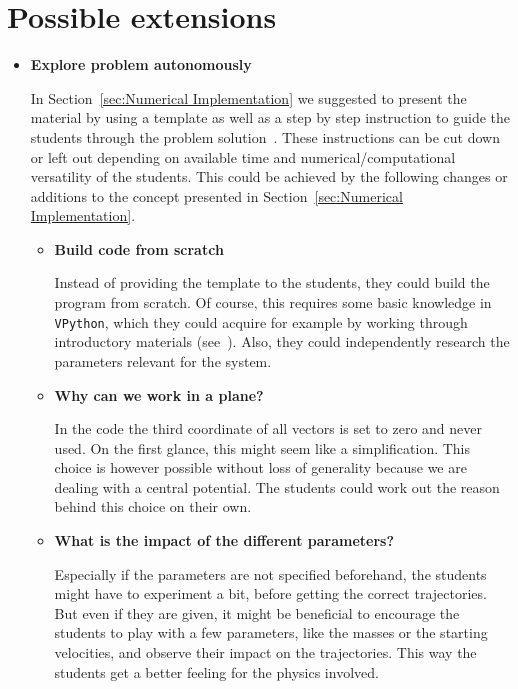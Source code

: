\documentclass[12pt,ngerman,american]{iopart}
\newcommand{\vpython}[0]{\texttt{VPython}}
\begin{document}
\section{Possible extensions}\label{sec:extensions}

\begin{itemize}

\item \textbf{Explore problem autonomously}

In Section~\ref{sec:Numerical Implementation} we suggested to present the material by using a template as well as a step by step instruction to guide the students through the problem solution~\cite{scripts}.
These instructions can be cut down or left out depending on available time and numerical/computational versatility of the students.
This could be achieved by the following changes or additions to the concept presented in Section~\ref{sec:Numerical Implementation}.

\begin{itemize}
\item \textbf{Build code from scratch}

Instead of providing the template to the students, they could build the program from scratch.
Of course, this requires some basic knowledge in \vpython{}, which they could acquire for example by working through introductory materials (see~\cite{VPython}).
Also, they could independently research the parameters relevant for the system.
\item \textbf{Why can we work in a plane?}

In the code the third coordinate of all vectors is set to zero and never used.
On the first glance, this might seem like a simplification.
This choice is however possible without loss of generality because we are dealing with a central potential.
The students could work out the reason behind this choice on their own.
\item \textbf{What is the impact of the different parameters?}

Especially if the parameters are not specified beforehand, the students might have to experiment a bit, before getting the correct trajectories.
But even if they are given, it might be beneficial to encourage the students to play with a few parameters, like the masses or the starting velocities, and observe their impact on the trajectories.
This way the students get a better feeling for the physics involved.
\end{itemize}


\end{itemize}
\end{document}
